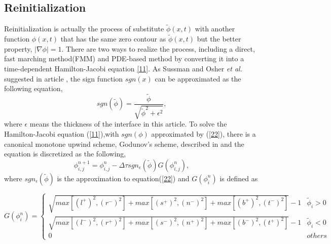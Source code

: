 \subsection{Reinitialization}
Reinitialization is actually the process of substitute $\tilde{\phi}(x,t)$ with another function $\phi(x,t)$ that has the same zero contour as $\tilde{\phi}(x,t)$ but the better property, $\left|\nabla\phi\right|=1$\cite{peng1999pde}. There are two ways to realize the process, including a direct, fast marching method(FMM)\cite{sethian1999level} and PDE-based method \cite{Sussman1994A} by converting it into a time-dependent Hamilton-Jacobi equation \ref{11}. As Sussman and Osher \textit{et al.} suggested in article \cite{Sussman1994A}, the sign function $sgn(x)$ can be approximated as the following equation,
\begin{equation}\label{22}
sgn(\tilde{\phi})=\frac{\tilde{\phi}}{\sqrt{{\tilde{\phi}}^2+\epsilon^2}},
\end{equation}
where $\epsilon$ means the thickness of the interface in this article. To solve the Hamilton-Jacobi equation (\ref{11}),with $sgn(\phi)$ approximated by (\ref{22}), there is a canonical monotone upwind scheme, Godunov's scheme, described in \cite{osher2006level,osher1991high} and the equation is discretized as the following,
\begin{equation}\label{23}
\phi^{n+1}_{i,j}=\phi^{n}_{i,j}-\Delta{\tau}sgn_\epsilon(\tilde{\phi})G(\phi^{n}_{i,j}),
\end{equation}
where $sgn_{\epsilon}(\tilde{\phi})$ is the approximation to equation(\ref{22}) and $G(\phi^{n}_{i})$ is defined as

\begin{equation}\label{24}
G(\phi^{n}_{i})=
\left\{
\begin{array}{ll}
\sqrt{max[(l^{+})^2,(r^{-})^2]+max[(s^{+})^2,(n^{-})^2]+max[(b^{+})^2,(t^{-})^2]}-1&{\tilde{\phi}_{i}>0} \\
\sqrt{max[(l^{-})^2,(r^{+})^2]+max[(s^{-})^2,(n^{+})^2]+max[(b^{-})^2,(t^{+})^2]}-1&{\tilde{\phi}_{i}<0}\\
0 & others 
\end{array}\right.
\end{equation}

